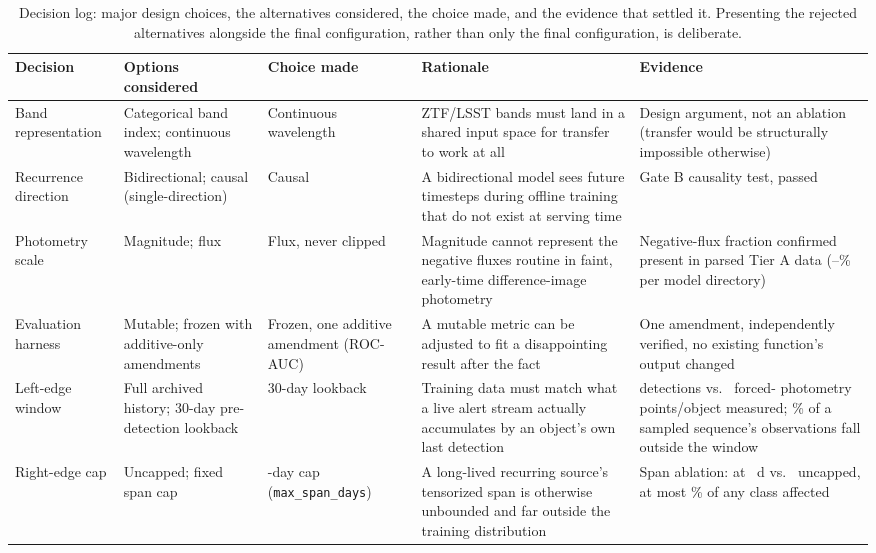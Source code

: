 \begin{table}[htb]
\centering
\caption{Decision log: major design choices, the alternatives considered,
the choice made, and the evidence that settled it. Presenting the rejected
alternatives alongside the final configuration, rather than only the final
configuration, is deliberate.}
\label{tab:decisionlog}
\scriptsize
\begin{tabular}{L{2.1cm}L{2.6cm}L{2.5cm}L{3.5cm}L{3.0cm}}
\toprule
Decision & Options considered & Choice made & Rationale & Evidence \\
\midrule
Band representation & Categorical band index; continuous wavelength &
  Continuous wavelength & ZTF/LSST bands must land in a shared input space
  for transfer to work at all & Design argument, not an ablation (transfer
  would be structurally impossible otherwise) \\
Recurrence direction & Bidirectional; causal (single-direction) & Causal &
  A bidirectional model sees future timesteps during offline training that
  do not exist at serving time & Gate B causality test, passed \\
Photometry scale & Magnitude; flux & Flux, never clipped & Magnitude cannot
  represent the negative fluxes routine in faint, early-time
  difference-image photometry & Negative-flux fraction confirmed present
  in parsed Tier A data (\TierANegFluxMin{}--\TierANegFluxMax{}\%
  per model directory) \\
Evaluation harness & Mutable; frozen with additive-only amendments &
  Frozen, one additive amendment (ROC-AUC) & A mutable metric can be
  adjusted to fit a disappointing result after the fact & One amendment,
  independently verified, no existing function's output changed \\
Left-edge window & Full archived history; 30-day pre-detection lookback &
  30-day lookback & Training data must match what a live alert stream
  actually accumulates by an object's own last detection &
  \WindowMeanDetections{} detections vs.\ \WindowMeanForcedPhot{} forced-
  photometry points/object measured; \WindowFracRemoved{}\% of a sampled
  sequence's observations fall outside the window \\
Right-edge cap & Uncapped; fixed span cap & \SpanChosenDefault{}-day cap
  (\texttt{max\_span\_days}) & A long-lived recurring source's tensorized
  span is otherwise unbounded and far outside the training distribution &
  Span ablation: \SpanTwoHundredMacroF{} at \SpanChosenDefault{}~d vs.\ \SpanUncappedMacroF{}
  uncapped, at most \SpanTwoHundredMaxAffected{}\% of any class affected \\

\end{tabular}
\end{table}
